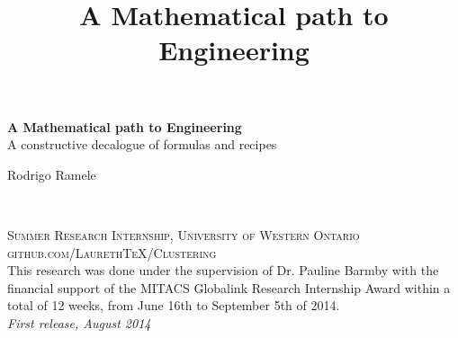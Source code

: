 \documentclass[11pt,fleqn]{book} %
\begin{document}
\title{A Mathematical path to Engineering}


\begingroup
\thispagestyle{empty}
\centering
\vspace*{5cm}
\par\normalfont\fontsize{35}{35}\sffamily\selectfont
\textbf{A Mathematical path to Engineering}\\
{\LARGE A constructive decalogue of formulas and recipes}\par %
\vspace*{1cm}
{\Huge Rodrigo Ramele}\par %
\endgroup


\newpage
~\vfill
\thispagestyle{empty}


\noindent \textsc{Summer Research Internship, University of Western Ontario}\\

\noindent \textsc{github.com/LaurethTeX/Clustering}\\ %

\noindent This research was done under the supervision of Dr. Pauline Barmby with the financial support of the MITACS Globalink Research Internship Award within a total of 12 weeks, from June 16th to September 5th of 2014.\\ %

\noindent \textit{First release, August 2014} %



\pagestyle{empty} %
\end{document}
